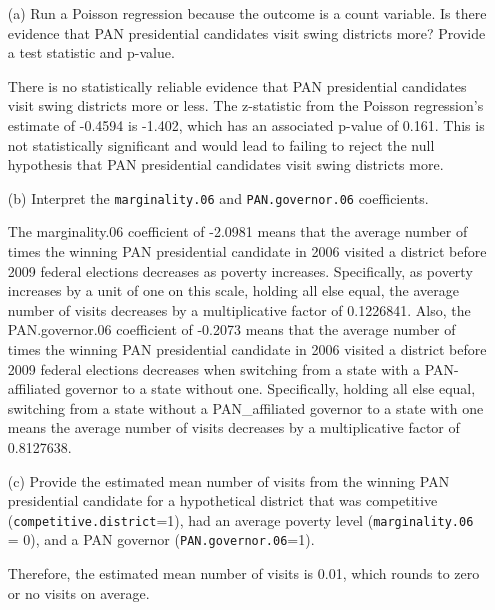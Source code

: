 \documentclass[12pt,letterpaper]{article}
\begin{document}
\begin{enumerate}
	\item [(a)]
	Run a Poisson regression because the outcome is a count variable. Is there evidence that PAN presidential candidates visit swing districts more? Provide a test statistic and p-value.
	
	  
	
	There is no statistically reliable evidence that PAN presidential candidates visit swing districts more or less. The z-statistic from the Poisson regression's estimate of -0.4594 is -1.402, which has an associated p-value of 0.161. This is not statistically significant and would lead to failing to reject the null hypothesis that PAN presidential candidates visit swing districts more.
	
	\item [(b)]
	Interpret the \texttt{marginality.06} and \texttt{PAN.governor.06} coefficients.
	
	  
	
	The marginality.06 coefficient of -2.0981 means that the average number of times the winning PAN presidential candidate in 2006 visited a district before 2009 federal elections decreases as poverty increases. Specifically, as poverty increases by a unit of one on this scale, holding all else equal, the average number of visits decreases by a multiplicative factor of 0.1226841. Also, the PAN.governor.06 coefficient of -0.2073 means that the average number of times the winning PAN presidential candidate in 2006 visited a district before 2009 federal elections decreases when switching from a state with a PAN-affiliated governor to a state without one. Specifically, holding all else equal, switching from a state without a PAN\_affiliated governor to a state with one means the average number of visits decreases by a multiplicative factor of 0.8127638.
	
	
	\item [(c)]
	Provide the estimated mean number of visits from the winning PAN presidential candidate for a hypothetical district that was competitive (\texttt{competitive.district}=1), had an average poverty level (\texttt{marginality.06} = 0), and a PAN governor (\texttt{PAN.governor.06}=1).
	
	  
	
	Therefore, the estimated mean number of visits is 0.01, which rounds to zero or no visits on average.
	
	
\end{enumerate}
	
\end{document}
